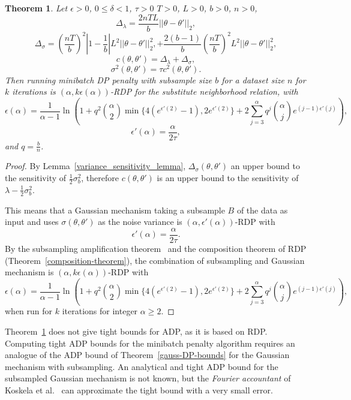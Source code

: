 \documentclass[english,twoside,openright]{HYgraduMLDS}
\newtheorem{theorem}[lemma]{Theorem}
\begin{document}
\begin{theorem}\label{dp_penalty_minibatch_theorem}
  Let \(\epsilon > 0\), \(0 \leq \delta < 1\), \(\tau > 0\) \(T > 0\),
  \(L > 0\), \(b > 0\), \(n > 0\),
  \[
    \Delta_\lambda = \frac{2nTL}{b}||\theta - \theta'||_2,
  \]
  \[
    \Delta_\sigma = \left(\frac{nT}{b}\right)^2 \left|1 - \frac{1}{b}\right|
    L^2||\theta - \theta'||_2^2,
    + \frac{2(b - 1)}{b}\left(\frac{nT}{b}\right)^2 L^2||\theta - \theta'||^2_2,
  \]
  \[
    c(\theta, \theta') = \Delta_\lambda + \Delta_\sigma,
  \]
  \[
    \sigma^2(\theta, \theta') = \tau c^2(\theta, \theta').
  \]
  Then running minibatch DP penalty with subsample size \(b\) for a dataset
  size \(n\) for \(k\) iterations
  is \((\alpha, k\epsilon(\alpha))\)-RDP for the substitute neighborhood
  relation, with
  \[
    \epsilon(\alpha) = \frac{1}{\alpha - 1}\ln \left(
      1 + q^2\binom{\alpha}{2}\min\{4(e^{\epsilon'(2)} - 1), 2e^{\epsilon'(2)}\}
      + 2 \sum_{j=3}^\alpha q^j\binom{\alpha}{j}e^{(j-1)\epsilon'(j)}\right),
  \]
  \[
    \epsilon'(\alpha) = \frac{\alpha}{2\tau},
  \]
  and \(q = \frac{b}{n}\).
\end{theorem}
\begin{proof}
    By Lemma~\ref{variance_sensitivity_lemma}, 
    \(\Delta_\sigma(\theta, \theta')\) an upper 
    bound to the sensitivity of \(\frac{1}{2}\sigma_b^2\), therefore 
    \(c(\theta, \theta')\) is an upper bound to the sensitivity of 
    \(\lambda - \frac{1}{2}\sigma_b^2\).

    This means that a Gaussian mechanism taking a subsample \(B\) of the data as 
    input and uses \(\sigma(\theta, \theta')\) as the noise variance 
    is \((\alpha, \epsilon'(\alpha))\)-RDP with 
    \[
        \epsilon'(\alpha) = \frac{\alpha}{2\tau}.
    \]
    By the subsampling amplification theorem~\cite[Theorem 9]{WangBK19} and 
    the composition theorem of RDP (Theorem~\ref{composition-theorem}),
    the combination of subsampling and Gaussian mechanism is 
    \((\alpha, k\epsilon(\alpha))\)-RDP with 
    \[
        \epsilon(\alpha) = \frac{1}{\alpha - 1}\ln \left(
        1 + q^2\binom{\alpha}{2}\min\{4(e^{\epsilon'(2)} - 1), 2e^{\epsilon'(2)}\}
        + 2 \sum_{j=3}^\alpha q^j\binom{\alpha}{j}e^{(j-1)\epsilon'(j)}\right),
    \]
    when run for \(k\) iterations for integer \(\alpha \geq 2\).
\end{proof}

Theorem~\ref{dp_penalty_minibatch_theorem} does not give tight bounds for ADP,
as it is based on RDP. Computing tight ADP bounds for the minibatch penalty
algorithm requires an analogue of the ADP bound of Theorem~\ref{gauss-DP-bounds}
for the Gaussian mechanism with subsampling. An analytical and tight ADP bound for
the subsampled Gaussian mechanism is not known, but the \emph{Fourier accountant}
of Koskela et al.~\cite{KJH20} can approximate the tight bound with a very small
error.
\end{document}

